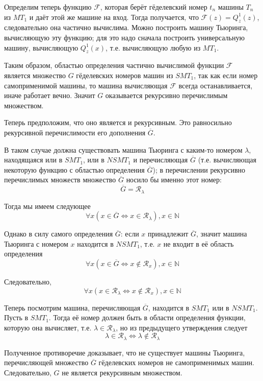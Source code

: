 \documentclass[a4paper, 12pt]{article}  %
\theoremstyle{definition}
\begin{document}
		Определим теперь функцию $\mathscr{F}$, которая берёт гёделевский номер $t_n$ машины $T_n$ из
		$MT_1$ и даёт этой же машине на вход. Тогда получается, что $\mathscr{F}(z) = Q^1_z(z)$,
		следовательно она частично вычислима. Можно построить машину Тьюринга, вычисляющую эту функцию; для
		это надо сначала построить универсальную машину, вычисляющую $Q^1_z(x)$, т.е. вычисляющую любую из
		$MT_1$.
		
		Таким образом, областью определения частично вычислимой функции $\mathscr{F}$ является множество
		$G$ гёделевских номеров машин из $SMT_1$, так как если номер самоприменимой машины, то машина
		вычисляющая $\mathscr{F}$ всегда останавливается, иначе работает вечно. Значит $G$ оказывается
		рекурсивно перечислимым множеством.
		
		Теперь предположим, что оно является и рекурсивным. Это равносильно рекурсивной перечислимости его
		дополнения $\overline{G}$.
		
		В таком случае должна существовать машина Тьюринга с каким-то номером $\lambda$, находящаяся или в
		$SMT_1$, или в $NSMT_1$ и перечисляющая $\overline{G}$ (т.е. вычисляющая некоторую функцию с
		областью определения $\overline{G}$); в перечислении рекурсивно перечислимых множеств
		множество $\overline{G}$ носило бы именно этот номер:
		$$ \overline{G} = \mathscr{R}_{\lambda} $$
		
		Тогда мы имеем следующее
		$$ \forall x ( x \in \overline{G} \Leftrightarrow  x \in \mathscr{R}_{\lambda} ), x \in \mathbb{N}$$
		
		Однако в силу самого определения $\overline{G}$: если $x$ принадлежит $\overline{G}$, значит машина
		Тьюринга с номером $x$ находится в $NSMT_1$, т.е. $x$ не входит в её область определения
		$$ \forall x (x \in \overline{G} \Leftrightarrow  x \notin \mathscr{R}_x ), x \in \mathbb{N}$$
		
		Следовательно,
		$$ \forall x (x \in \mathscr{R}_{\lambda} \Leftrightarrow  x \notin \mathscr{R}_x), x \in \mathbb{N} $$
		
		Теперь посмотрим машина, перечисляющая $\overline{G}$, находится в $SMT_1$ или в $NSMT_1$. Пусть в
		$SMT_1$. Тогда её номер должен быть в области определения функции, которую она вычисляет, т.е. 
		$\lambda \in \mathscr{R}_{\lambda}$, но из предыдущего утверждения следует 
		$$ \lambda \in \mathscr{R}_{\lambda} \Leftrightarrow  \lambda \notin \mathscr{R}_{\lambda}$$
		
		Полученное противоречие доказывает, что не существует машины Тьюринга, перечисляющей множество
		$\overline{G}$ гёделевских номеров не самоприменимых машин. Следовательно, $G$ не является
		рекурсивным множеством.
\end{document}
